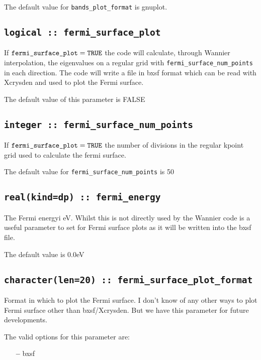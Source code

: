 The default value for \verb#bands_plot_format# is gnuplot.


\subsection[fermi\_surface\_plot]{\tt logical :: fermi\_surface\_plot}

If $\verb#fermi_surface_plot#=\verb#TRUE#$ the code will calculate,
through Wannier interpolation, the
eigenvalues on a regular grid with \verb#fermi_surface_num_points# in
each direction. The code will write a file in bxsf format which can be
read with Xcrysden and used to plot the Fermi surface.

The default value of this parameter is FALSE


\subsection[fermi\_surface\_num\_points]{\tt integer :: fermi\_surface\_num\_points}

If $\verb#fermi_surface_plot#=\verb#TRUE#$ the number of divisions in
the regular kpoint grid used to calculate the fermi surface.

The default value for \verb#fermi_surface_num_points# is 50


\subsection[fermi\_energy]{\tt real(kind=dp) :: fermi\_energy}
The Fermi energyi eV. Whilst this is not directly used by the Wannier 
code is a useful parameter to set for Fermi surface plots as
it will be written into the bxsf file.

The default value is 0.0eV


\subsection[fermi\_surface\_plot\_format]{\tt character(len=20) :: fermi\_surface\_plot\_format}

Format in which to plot the Fermi surface. I don't know of any other ways
to plot Fermi surface other than bxsf/Xcrysden. But we have this
parameter for future developments. 

The valid options for this parameter are:
\begin{itemize}
\item[{\bf --}] bxsf
\end{itemize}

